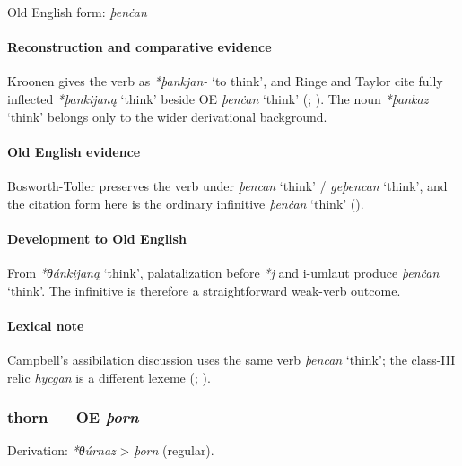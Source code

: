 \documentclass[
  british,
  a4paper,
]{article}
\providecommand{\Recon}[1]{\emph{*#1}}
\begin{document}
Old English form: \emph{þenċan}

\paragraph{Reconstruction and comparative
evidence}\label{reconstruction-and-comparative-evidence-59}

Kroonen gives the verb as \emph{*þankjan-} `to think', and Ringe and
Taylor cite fully inflected \Recon{þankijaną} `think' beside OE
\emph{þenċan} `think' (;
). The noun
\Recon{þankaz} `think' belongs only to the wider derivational
background.

\paragraph{Old English evidence}\label{old-english-evidence-59}

Bosworth-Toller preserves the verb under \emph{þencan} `think' /
\emph{geþencan} `think', and the citation form here is the ordinary
infinitive \emph{þenċan} `think'
().

\paragraph{Development to Old
English}\label{development-to-old-english-59}

From \Recon{θánkijaną} `think', palatalization before \emph{*j} and
i-umlaut produce \emph{þenċan} `think'. The infinitive is therefore a
straightforward weak-verb outcome.

\paragraph{Lexical note}\label{lexical-note}

Campbell's assibilation discussion uses the same verb \emph{þencan}
`think'; the class-III relic \emph{hycgan} is a different lexeme
(;
).

\subsubsection{\texorpdfstring{thorn --- OE
\emph{þorn}}{thorn --- OE þorn}}\label{thorn-oe-uxfeorn}

Derivation: \emph{*θúrnaz} \textgreater{} \emph{þorn} (regular).
\end{document}
